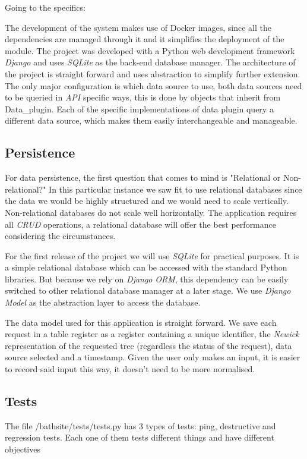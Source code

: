 \documentclass[10pt]{article}
\begin{document}
 Going to the specifics:
 
The development of the system makes use of Docker images, since all the dependencies are managed through it and it simplifies the deployment of the module. The project was developed with a Python web development framework \textit{Django} and uses \textit{SQLite} as the back-end database manager. The architecture of the project is straight forward and uses abstraction to simplify further extension. The only major configuration is which data source to use, both data sources need to be queried in \textit{API} specific ways, this is done by objects that inherit from Data\_plugin. Each of the specific implementations of data plugin query a different data source, which makes them easily interchangeable and manageable.

 \subsection{Persistence}
 
For data persistence, the first question that comes to mind is "Relational or Non-relational?" In this particular instance we saw fit to use relational databases since the data we would be highly structured and we would need to scale vertically. Non-relational databases do not scale well horizontally. The application requires all \textit{CRUD} operations, a relational database will offer the best performance considering the circumstances.

For the first release of the project we will use \textit{SQLite} for practical purposes. It is a simple relational database which can be accessed with the standard Python libraries. But because we rely on \textit{Django} \textit{ORM}, this dependency can be easily switched to other relational database manager at a later stage. We use \textit{Django Model} as the abstraction layer to access the database.

The data model used for this application is straight forward. We save each request in a table register as a register containing a unique identifier, the \textit{Newick} representation of the requested tree (regardless the status of the request), data source selected and a timestamp. Given the user only makes an input, it is easier to record said input this way, it doesn't need to be more normalised.
 
 \subsection{Tests}
The file /bathsite/tests/tests.py has 3 types of tests: ping, destructive and regression tests. Each one of them tests different things and have different objectives
\end{document}
